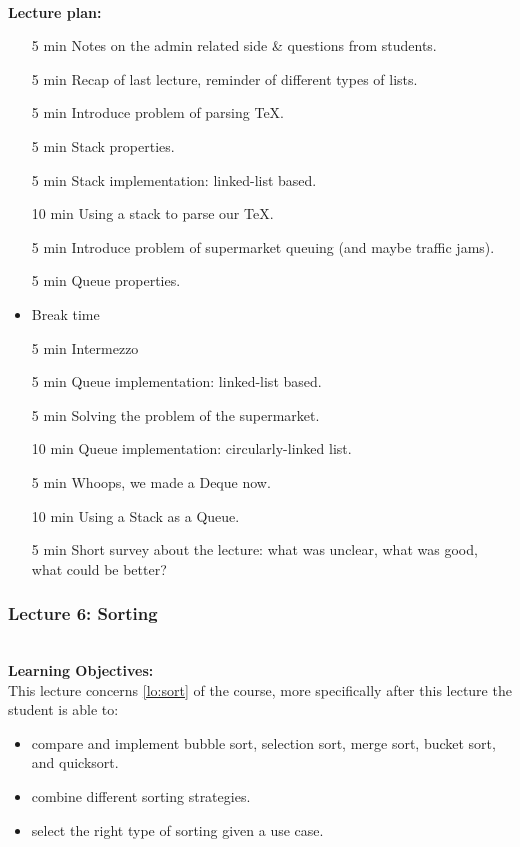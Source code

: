 \hfill\\
\textbf{Lecture plan:}\\
\begin{itemize}
	\item[5 min] Notes on the admin related side \& questions from students.
	\item[5 min] Recap of last lecture, reminder of different types of lists.
	\item[5 min] Introduce problem of parsing TeX.
	\item[5 min] Stack properties.
	\item[5 min] Stack implementation: linked-list based.
	\item[10 min] Using a stack to parse our TeX.
	\item[5 min] Introduce problem of supermarket queuing (and maybe traffic jams).
	\item[5 min] Queue properties.
	\item Break time
	\item[5 min] Intermezzo
	\item[5 min] Queue implementation: linked-list based.
	\item[5 min] Solving the problem of the supermarket.
	\item[10 min] Queue implementation: circularly-linked list.
	\item[5 min] Whoops, we made a Deque now.
	\item[10 min] Using a Stack as a Queue.
	\item[5 min] Short survey about the lecture: what was unclear, what was good, what could be better?
\end{itemize}

\newpage
\subsubsection{Lecture 6: Sorting}
\label{sub:lecture_6}

\hfill\\
\textbf{Learning Objectives:}\\

This lecture concerns \cref{lo:sort} of the course, more specifically after this lecture the student is able
to:
\begin{itemize}
	\item compare and implement bubble sort, selection sort, merge sort, bucket sort, and quicksort.
	\item combine different sorting strategies.
	\item select the right type of sorting given a use case.
\end{itemize}

